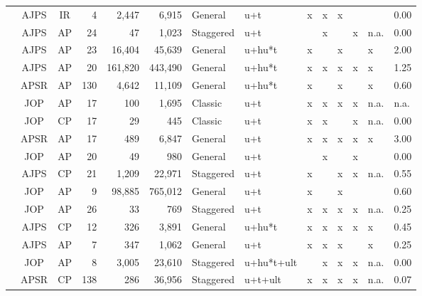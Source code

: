 \documentclass[12pt]{article}
\begin{document}
\begin{landscape}
\begin{table}[!htbp]
{\begin{tabular}{L{7.2cm}ccrrrC{2cm}C{2.5cm}C{2cm}C{2cm}C{2cm}C{2cm}C{2cm}C{2cm}}
\citet{Distelhorst2018} & AJPS  & IR    & 4     & 2,447 & 6,915 & General & u+t & x & x   &  x  &   &  & 0.00 \\
\citet{eckhouse2022metrics} & AJPS   & AP    & 24    & 47 & 1,023 & Staggered & u+t &  & x    &    & x  & n.a.  & 0.00\\
\citet{Fouirnaies2018ajps} & AJPS  & AP    & 23    & 16,404 & 45,639 & General & u+hu*t &  x  &   &  x  &   & x & 2.00\\
\citet{fh2018} & AJPS  & AP    & 20    & 161,820 & 443,490 & General & u+hu*t &  x  &  x  & x   & x & x  & 1.25\\
\citet{Fouirnaies2022} & APSR   & AP    & 130    & 4,642 & 11,109 & General & u+hu*t & x   &    &  x  &  & x  & 0.60\\ \hline
\citet{Fresh2018} & JOP   & AP    & 17    & 100   & 1,695 & Classic & u+t &  x  &  x  &  x  & x & n.a.  & n.a.\\
\citet{Garfias2019jop} & JOP   & CP    & 17    & 29    & 445   & Classic & u+t & x   & x   &    & x & n.a.  & 0.00\\
\citet{Grumbach2020} & APSR  & AP    & 17    & 489   & 6,847 & General & u+t &  x  &  x  & x   & x & x  & 3.00\\
\citet{Grumbach2022} & JOP   &  AP   &  20   & 49 & 980 & General & u+t &  &  x  &    &  x &   & 0.00\\
{\footnotesize\citet{hainmueller2019does}} & AJPS  & CP    & 21    & 1,209   & 22,971 & Staggered & u+t & x  &   &  x  & x &  n.a. & 0.55\\ \hline
\citet{Hall2022} & JOP   &  AP   & 9    & 98,885 & 765,012 & General & u+t &  x  &    &  x &  &   & 0.60\\
\citet{Hirano2022} & JOP   &   AP  &  26   & 33 & 769 & Staggered & u+t &  x  &  x  &  x  &  x & n.a.  & 0.25\\
\citet{Jiang2018} & AJPS  & CP    & 12    & 326   & 3,891 & General & u+hu*t &  x  & x   &  x  & x & x  & 0.45\\
\citet{kilborn2022public} &  AJPS  & AP & 7    &  347   & 1,062 & General & u+t & x  &  x & x   &    & x  &  0.25\\
\citet{Kogan2021} & JOP   & AP    & 8     & 3,005 & 23,610 & Staggered & u+hu*t+ult &   &  x  &  x  & x & n.a.  & 0.00\\ \hline
{\footnotesize\citet{magaloni2020killing}} & APSR  & CP    & 138   & 286   & 36,956 & Staggered & u+t+ult & x  &  x  &  x  & x & n.a.  & 0.07\\

\end{tabular}}
\end{table}
\end{landscape}
\end{document}
